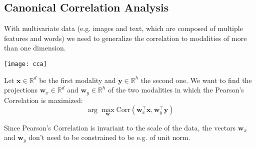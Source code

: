 \subsection{Canonical Correlation Analysis}
With multivariate data (e.g. images and text, which are composed of multiple features and words) we need to generalize the correlation to modalities of more than one dimension.
\begin{center}
	\texttt{[image: cca]}
\end{center}
Let $\mathbf{x} \in \mathbb{R}^d$ be the first modality and $\mathbf{y} \in \mathbb{R}^h$ the second one. We want to find the projections $\mathbf{w}_x \in \mathbb{R}^d$ and $\mathbf{w}_y \in \mathbb{R}^h$ of the two modalities in which the Pearson's Correlation is maximized:
\begin{equation*}
	\arg\max_\mathbf{w} \text{Corr}(\mathbf{w}_x^\top \mathbf{x}, \mathbf{w}_y^\top \mathbf{y})
\end{equation*}
\begin{note}
	Since Pearson's Correlation is invariant to the scale of the data, the vectors $\mathbf{w}_x$ and $\mathbf{w}_y$ don't need to be constrained to be e.g. of unit norm.
\end{note}

